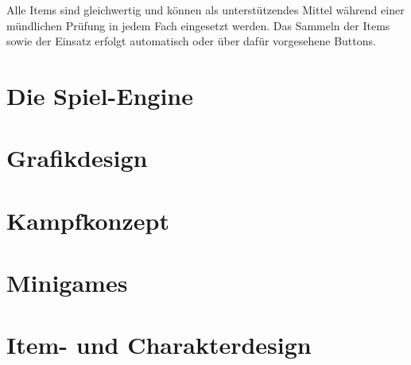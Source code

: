 Alle Items sind gleichwertig und können als unterstützendes Mittel während einer mündlichen Prüfung in jedem Fach eingesetzt werden. Das Sammeln der Items sowie der Einsatz erfolgt automatisch oder über dafür vorgesehene Buttons.

\section{Die Spiel-Engine}


\section{Grafikdesign}


\section{Kampfkonzept}


\section{Minigames}


\section{Item- und Charakterdesign}


